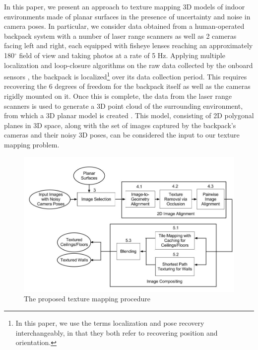 \documentclass[]{spie}  %
\begin{document}
In this paper, we present an approach to texture mapping 3D models of
indoor environments made of planar surfaces in the presence of
uncertainty and noise in camera poses. In particular, we consider data
obtained from a human-operated backpack system with a number of laser
range scanners as well as 2 cameras facing left and right, each
equipped with fisheye lenses reaching an approximately 180$^{\circ}$
field of view and taking photos at a rate of 5 Hz. Applying multiple
localization and loop-closure algorithms on the raw data collected by
the onboard sensors \cite{chen2010indoor, kua2012loopclosure,
  liu2010indoor}, the backpack is localized\footnote{In this paper, we
  use the terms localization and pose recovery interchangeably, in
  that they both refer to recovering position and orientation.}  over
its data collection period. This requires recovering the 6 degrees of
freedom for the backpack itself as well as the cameras rigidly mounted
on it. Once this is complete, the data from the laser range scanners
is used to generate a 3D point cloud of the surrounding environment,
from which a 3D planar model is created \cite{sanchez2012point}. This
model, consisting of 2D polygonal planes in 3D space, along with the
set of images captured by the backpack's cameras and their noisy 3D
poses, can be considered the input to our texture mapping problem.

\begin{figure}
  \centering
  \includegraphics[width=6in]{flowchart.jpg}
  \caption{The proposed texture mapping procedure\\}
  \label{fig:flowchart}
\end{figure}
\end{document}
